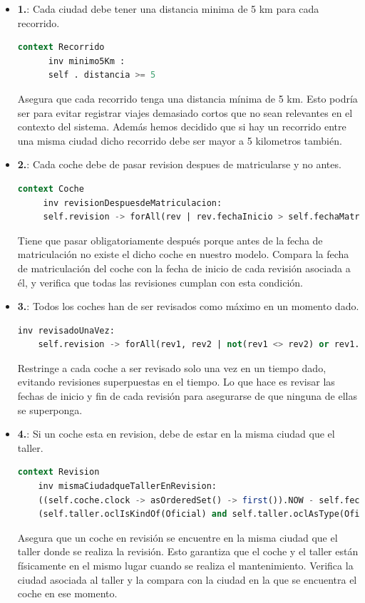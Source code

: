 \documentclass[12pt.a4paper]{article}
\begin{document}
\begin{itemize}
    \item \textbf{1.}: Cada ciudad debe tener una distancia minima de 5 km para cada recorrido.
    \begin{lstlisting}[style = useEspecifico,language=SQL]
    context Recorrido
      inv minimo5Km :
      self . distancia >= 5
    \end{lstlisting}
    Asegura que cada recorrido tenga una distancia mínima de 5 km. Esto podría ser para evitar registrar viajes demasiado cortos que no sean relevantes en el contexto del sistema. Además hemos decidido que si hay un recorrido entre una misma ciudad dicho recorrido debe ser mayor a 5 kilometros también.
    
    \item \textbf{2.}: Cada coche debe de pasar revision despues de matricularse y no antes.
    \begin{lstlisting}[style = useEspecifico,language=SQL]
   context Coche
     inv revisionDespuesdeMatriculacion:
     self.revision -> forAll(rev | rev.fechaInicio > self.fechaMatriculacion)
    \end{lstlisting}
    Tiene que pasar obligatoriamente después porque antes de la fecha de matriculación no existe el dicho coche en nuestro modelo.
    Compara la fecha de matriculación del coche con la fecha de inicio de cada revisión asociada a él, y verifica que todas las revisiones cumplan con esta condición. 
    
    \item \textbf{3.}: Todos los coches han de ser revisados como máximo en un momento dado.
    \begin{lstlisting}[style = useEspecifico,language=SQL]
    inv revisadoUnaVez:
    self.revision -> forAll(rev1, rev2 | not(rev1 <> rev2) or rev1.fechaInicio <> rev2.fechaInicio and (rev1.fechaInicio >= rev2.fechaFin or rev2.fechaInicio >= rev1.fechaFin))
    \end{lstlisting}
    Restringe a cada coche a ser revisado solo una vez en un tiempo dado, evitando revisiones superpuestas en el tiempo.
    Lo que hace es revisar las fechas de inicio y fin de cada revisión para asegurarse de que ninguna de ellas se superponga.
    
    \item \textbf{4.}: Si un coche esta en revision, debe de estar en la misma ciudad que el taller.
    \begin{lstlisting}[style = useEspecifico,language=SQL]
  context Revision
    inv mismaCiudadqueTallerEnRevision:
    ((self.coche.clock -> asOrderedSet() -> first()).NOW - self.fechaFin) < 0 implies
    (self.taller.oclIsKindOf(Oficial) and self.taller.oclAsType(Oficial).ciudad = self.coche.ciudad) or (self.taller.oclIsKindOf(No_Oficial) and self.taller.oclAsType(No_Oficial).ciudad = self.coche.ciudad)
    \end{lstlisting}
    Asegura que un coche en revisión se encuentre en la misma ciudad que el taller donde se realiza la revisión. Esto garantiza que el coche y el taller están físicamente en el mismo lugar cuando se realiza el mantenimiento.
    Verifica la ciudad asociada al taller y la compara con la ciudad en la que se encuentra el coche en ese momento.
    

\end{itemize}
\end{document}
